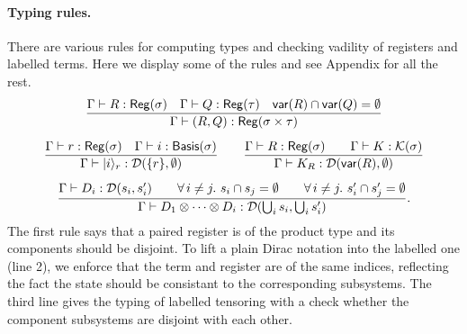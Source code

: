 \paragraph*{Typing rules.}
There are various rules for computing types and checking vadility of registers and labelled terms. Here we display some of the rules and see Appendix for all the rest.
\begin{gather*}
  \frac{
      \Gamma \vdash R : \mathsf{Reg}(\sigma) \quad
      \Gamma \vdash Q : \mathsf{Reg}(\tau)
      \quad \mathsf{var}(R) \cap \mathsf{var}(Q) = \emptyset
  }{\Gamma \vdash (R,Q) : \mathsf{Reg}(\sigma \times \tau)} \\[0.2cm]
  \frac{
          \Gamma \vdash r : \mathsf{Reg}(\sigma) \quad
          \Gamma \vdash i : \mathsf{Basis}(\sigma)}
  {\Gamma \vdash |i\rangle_r : \mathcal{D}(\{r\}, \emptyset)}
  \qquad
  \frac{\Gamma \vdash R : \mathsf{Reg}(\sigma)\qquad \Gamma \vdash K : \mathcal{K}(\sigma)}{\Gamma \vdash K_R : \mathcal{D}(\mathsf{var}(R), \emptyset)} \\[0.2cm]
    \frac{
        \Gamma \vdash D_i : \mathcal{D}(s_i,s_i') \qquad
        \forall\,i\neq j.\ s_i\cap s_j = \emptyset \qquad
        \forall\,i\neq j.\ s'_i\cap s'_j = \emptyset
    }
    {\Gamma \vdash D_1 \otimes \cdots \otimes D_i : \mathcal{D}(\bigcup_i s_i, \bigcup_i s_i')}.
\end{gather*}
The first rule says that a paired register is of the product type and its components should be disjoint.
To lift a plain Dirac notation into the labelled one (line 2), we enforce that the term and register are of the same indices, reflecting the fact the state should be consistant to the corresponding subsystems.
The third line gives the typing of labelled tensoring with a check whether the component subsystems are disjoint with each other.


